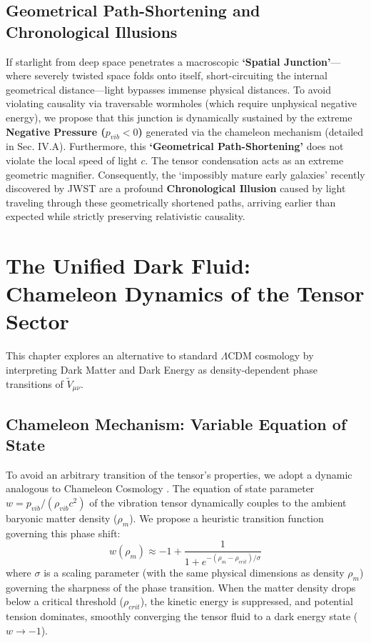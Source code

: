 \documentclass[reprint,amsmath,amssymb,aps,prd]{revtex4-2}
\begin{document}
\subsection{Geometrical Path-Shortening and Chronological Illusions}
If starlight from deep space penetrates a macroscopic \textbf{`Spatial Junction'}---where severely twisted space folds onto itself, short-circuiting the internal geometrical distance---light bypasses immense physical distances.
To avoid violating causality via traversable wormholes (which require unphysical negative energy), we propose that this junction is dynamically sustained by the extreme \textbf{Negative Pressure ($p_{vib} < 0$)} generated via the chameleon mechanism (detailed in Sec. IV.A).
Furthermore, this \textbf{`Geometrical Path-Shortening'} does not violate the local speed of light $c$.
The tensor condensation acts as an extreme geometric magnifier. Consequently, the `impossibly mature early galaxies' recently discovered by JWST are a profound \textbf{Chronological Illusion} caused by light traveling through these geometrically shortened paths, arriving earlier than expected while strictly preserving relativistic causality.

\section{The Unified Dark Fluid: Chameleon Dynamics of the Tensor Sector}
This chapter explores an alternative to standard $\Lambda$CDM cosmology \cite{Riess1998} by interpreting Dark Matter and Dark Energy as density-dependent phase transitions of $\tilde{V}_{\mu\nu}$.

\subsection{Chameleon Mechanism: Variable Equation of State}
To avoid an arbitrary transition of the tensor's properties, we adopt a dynamic analogous to Chameleon Cosmology \cite{Khoury2004}.
The equation of state parameter $w = p_{vib} / (\rho_{vib} c^2)$ of the vibration tensor dynamically couples to the ambient baryonic matter density ($\rho_m$).
We propose a heuristic transition function governing this phase shift:
\begin{equation}
w(\rho_m) \approx -1 + \frac{1}{1 + e^{-(\rho_m - \rho_{crit})/\sigma}}
\end{equation}
where $\sigma$ is a scaling parameter (with the same physical dimensions as density $\rho_m$) governing the sharpness of the phase transition.
When the matter density drops below a critical threshold ($\rho_{crit}$), the kinetic energy is suppressed, and potential tension dominates, smoothly converging the tensor fluid to a dark energy state ($w \to -1$).
\end{document}
